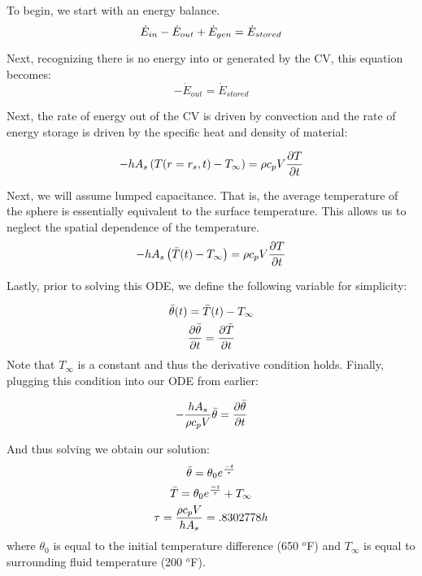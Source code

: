 \documentclass{article}
\begin{document}
\newpage
{}
To begin, we start with an energy balance. 
\begin{equation}
    \Dot{E}_{in} - \Dot{E}_{out} + \Dot{E}_{gen} = \Dot{E}_{stored}
\end{equation}

Next, recognizing there is no energy into or generated by the CV, this equation becomes:
\begin{equation}
    -\Dot{E}_{out} = \Dot{E}_{stored}
\end{equation}

Next, the rate of energy out of the CV is driven by convection and the rate of energy storage is driven by the specific heat and density of material:

\begin{equation}
    -h A_s \left(T(r=r_s,t) - T_{\infty}\right) = \rho c_p V \frac{\partial T}{\partial t}
\end{equation}

Next, we will assume lumped capacitance. That is, the average temperature of the sphere is essentially equivalent to the surface temperature. This allows us to neglect the spatial dependence of the temperature. 
\begin{equation}
    -h A_s \left(\Bar{T}(t) - T_{\infty}\right) = \rho c_p V \frac{\partial T}{\partial t}
\end{equation}

Lastly, prior to solving this ODE, we define the following variable for simplicity:

\begin{equation}
    \begin{gathered}
    \Bar{\theta}(t) = \Bar{T}(t) - T_{\infty}\\
    \frac{\partial \Bar{\theta}}{\partial t} = \frac{\partial \Bar{T}}{\partial t}
    \end{gathered}
\end{equation}
Note that $T_{\infty}$ is a constant and thus the derivative condition holds. Finally, plugging this condition into our ODE from earlier:

\begin{equation}
    -\frac{h A_s }{\rho c_p V} \Bar{\theta} = \frac{\partial \Bar{\theta}}{\partial t}
\end{equation}

And thus solving we obtain our solution:
\begin{equation}
    \begin{gathered}
        \Bar{\theta} = \theta_0 e^{\frac{-t}{\tau}} \\
        \Bar{T} = \theta_0 e^{\frac{-t}{\tau}} + T_{\infty} \\
        \tau = \frac{\rho c_p V}{h A_s} = .8302778 h
    \end{gathered}
\end{equation}
where $\theta_0$ is equal to the initial temperature difference (650 $^o$F) and $T_{\infty}$ is equal to surrounding fluid temperature (200 $^o$F). 
\end{document}
